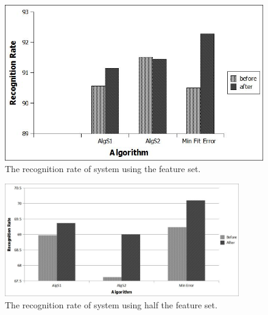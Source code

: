 \documentclass[10pt]{article}
\begin{document}
 
 
    \begin{figure}
  \centering
  \includegraphics[scale=0.5]{Experiment92.jpg}
  \caption[Recognition accuracy]%
  {The recognition rate of system using the feature set.}
   \label{exp2}
\end{figure}
\begin{figure}
  \centering
  \includegraphics[width=4in]{Experiment68.jpg}
  \caption[Recognition accuracy]%
  {The recognition rate of system using half the feature set.}
   \label{exp1}
\end{figure}
\end{document}
